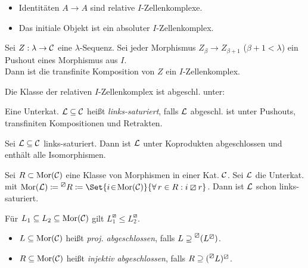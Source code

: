 \documentclass{cheat-sheet}
\newcommand{\lhhe}{\boxslash} %
\begin{document}
\begin{bspe}
  \begin{itemize}
    \item Identitäten $A \to A$ sind relative $I$-Zellenkomplexe.
    \item Das initiale Objekt ist ein absoluter $I$-Zellenkomplex.
  \end{itemize}
\end{bspe}

\begin{lem}
  Sei $Z : \lambda \to \mathcal{C}$ eine $\lambda$-Sequenz.
  Sei jeder Morphismus $Z_\beta \to Z_{\beta + 1}$ ($\beta + 1 < \lambda$) ein Pushout eines Morphismus aus $I$. \\
  Dann ist die transfinite Komposition von $Z$ ein $I$-Zellenkomplex.
\end{lem}

\begin{thm}
  Die Klasse der relativen $I$-Zellenkomplex ist abgeschl. unter: \\
   \enspace
   \enspace
\end{thm}


\begin{defn}
  Eine Unterkat. $\mathcal{L} \subseteq \mathcal{C}$ heißt \emph{links-saturiert}, falls $\mathcal{L}$ abgeschl. ist unter Pushouts, transfiniten Kompositionen und Retrakten.
\end{defn}

\begin{lem}
  Sei $\mathcal{L} \subseteq \mathcal{C}$ links-saturiert. Dann ist $\mathcal{L}$ unter Koprodukten abgeschlossen und enthält alle Isomorphismen.
\end{lem}

\begin{bsp}
  Sei $R \subset \operatorname{Mor}(\mathcal{C})$ eine Klasse von Morphismen in einer Kat. $\mathcal{C}$.
  Sei $\mathcal{L}$ die Unterkat. mit $\Mor(\Lat) \coloneqq \prescript{\lhhe}{} R \coloneqq \Set{i \!\in\! \Mor(\Cat)}{\fa{r \in R\!}\! i \lhhe r}$.
  Dann ist $\mathcal{L}$ schon links-saturiert.
\end{bsp}


\begin{prop}
  Für $L_1 \subseteq L_2 \subseteq \operatorname{Mor}(\mathcal{C})$ gilt $L_1^\lhhe \leq L_2^\lhhe$.
\end{prop}

\begin{defn}
  \begin{itemize}
    \item $L \subseteq \operatorname{Mor}(\mathcal{C})$ heißt \emph{proj. abgeschlossen}, falls $L \supseteq \prescript{\lhhe}{} (L^\lhhe)$.
    \item $R \subseteq \operatorname{Mor}(\mathcal{C})$ heißt \emph{injektiv abgeschlossen}, falls $R \supseteq (\prescript{\lhhe}{} L)^\lhhe$.
  \end{itemize}
\end{defn}
\end{document}

